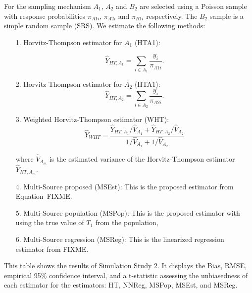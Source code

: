 \documentclass[12pt]{article}
\begin{document}
For the sampling mechanism $A_1$, $A_2$ and $B_2$ are selected using a Poisson
sample with response probabilities $\pi_{A1i}$, $\pi_{A2i}$ and $\pi_{B1i}$
respectively. The $B_2$ sample is a simple random sample (SRS). We estimate the
following methods:

\begin{itemize}
  \item[1.] Horvitz-Thompson estimator for $A_1$ (HTA1):

    $$\hat Y_{HT, A_1} = \sum_{i \in A_1} \frac{y_i}{\pi_{A1i}}.$$
  \item[2.] Horvitz-Thompson estimator for $A_2$ (HTA1):
    $$\hat Y_{HT, A_2} = \sum_{i \in A_2} \frac{y_i}{\pi_{A2i}}.$$
  \item[3.] Weighted Horvitz-Thompson estimator (WHT):
    $$\hat Y_{WHT} = \frac{\hat Y_{HT, A_1} / \hat V_{A_1} + \hat Y_{HT, A_2} /
    \hat V_{A_2}}{1 / \hat V_{A_1} + 1 / \hat V_{A_2}}$$

    where $\hat V_{A_m}$ is the estimated variance of the Horvitz-Thompson
    estimator $\hat Y_{HT, A_m}$.
  \item[4.] Multi-Source proposed (MSEst): This is the proposed estimator from
    Equation~FIXME.
  \item[5.] Multi-Source population (MSPop): This is the proposed estimator with
    using the true value of $T_1$ from the population,
  \item[6.] Multi-Source regression (MSReg): This is the linearized regression
    estimator from FIXME.
\end{itemize}

\begin{table}[ht!]
  \centering
  
\caption{This table shows the results of Simulation Study 2. It displays the
Bias, RMSE, empirical 95\% confidence interval, and a t-statistic assessing the
unbiasedness of each estimator for the estimators: HT, NNReg, MSPop, MSEst, and
MSReg.}
\label{tab:msdc2-mean}
\end{table}


\newpage 



\end{document}
